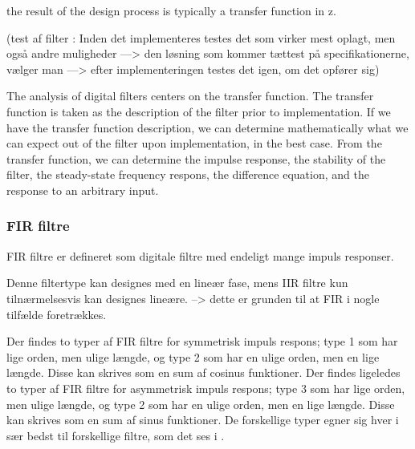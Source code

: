 the result of the design process is typically a transfer function in z. 

(test af filter : Inden det implementeres testes det som virker mest oplagt, men også andre muligheder —> den løsning som kommer tættest på specifikationerne, vælger man —> efter implementeringen testes det igen, om det opfører sig)


The analysis of digital filters centers on the transfer function. The transfer function is taken as the description of the filter prior to implementation. If we have the transfer function description, we can determine mathematically what we can expect out of the filter upon implementation, in the best case. From the transfer function, we can determine the impulse response, the stability of the filter, the steady-state frequency respons, the difference equation, and the response to an arbitrary input.

\citep{Blandford2013}



\subsubsection{FIR filtre}
FIR filtre er defineret som digitale filtre med endeligt mange impuls responser.

Denne filtertype kan designes med en lineær fase, mens IIR filtre kun tilnærmelsesvis kan designes lineære.
--> dette er grunden til at FIR i nogle tilfælde foretrækkes.

Der findes to typer af FIR filtre for symmetrisk impuls respons; type 1 som har lige orden, men ulige længde, og type 2 som har en ulige orden, men en lige længde. Disse kan skrives som en sum af cosinus funktioner.
Der findes ligeledes to typer af FIR filtre for asymmetrisk impuls respons; type 3 som har lige orden, men ulige længde, og type 2 som har en ulige orden, men en lige længde. Disse kan skrives som en sum af sinus funktioner.
De forskellige typer egner sig hver i sær bedst til forskellige filtre, som det ses i . \citep{Blandford2013}

